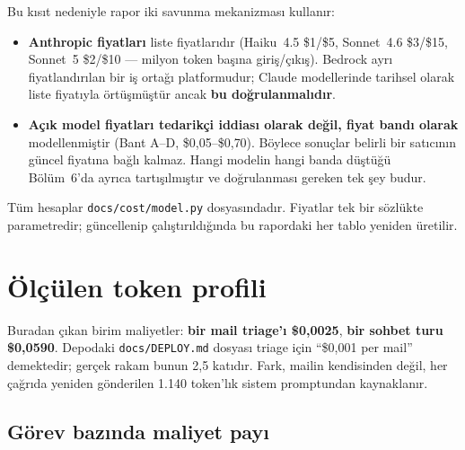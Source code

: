 \documentclass[11pt,a4paper]{article}
\newcommand{\code}[1]{\texttt{\small #1}}
\begin{document}
Bu kısıt nedeniyle rapor iki savunma mekanizması kullanır:

\begin{itemize}[leftmargin=1.4em,itemsep=3pt]
  \item \textbf{Anthropic fiyatları} liste fiyatlarıdır (Haiku~4.5 \$1/\$5,
        Sonnet~4.6 \$3/\$15, Sonnet~5 \$2/\$10 --- milyon token başına giriş/çıkış).
        Bedrock ayrı fiyatlandırılan bir iş ortağı platformudur; Claude modellerinde
        tarihsel olarak liste fiyatıyla örtüşmüştür ancak \textbf{bu doğrulanmalıdır}.
  \item \textbf{Açık model fiyatları tedarikçi iddiası olarak değil, fiyat bandı olarak}
        modellenmiştir (Bant A--D, \$0{,}05--\$0{,}70). Böylece sonuçlar belirli bir
        satıcının güncel fiyatına bağlı kalmaz. Hangi modelin hangi banda düştüğü
        Bölüm~6'da ayrıca tartışılmıştır ve doğrulanması gereken tek şey budur.
\end{itemize}

Tüm hesaplar \code{docs/cost/model.py} dosyasındadır. Fiyatlar tek bir sözlükte
parametredir; güncellenip çalıştırıldığında bu rapordaki her tablo yeniden üretilir.

\section{Ölçülen token profili}

\begin{table}[h]
\centering\small

\caption{Çağrı başına token profili. Ack ve sohbet her kullanıcı mesajında birlikte çalışır.}
\end{table}

Buradan çıkan birim maliyetler: \textbf{bir mail triage'ı \$0{,}0025},
\textbf{bir sohbet turu \$0{,}0590}. Depodaki \code{docs/DEPLOY.md} dosyası triage için
``\$0{,}001 per mail'' demektedir; gerçek rakam bunun 2{,}5 katıdır. Fark, mailin
kendisinden değil, her çağrıda yeniden gönderilen 1.140 token'lık sistem promptundan
kaynaklanır.

\subsection{Görev bazında maliyet payı}

\begin{table}[h]
\centering\small

\caption{Orta profil (50 mail, 8 sohbet/gün), bugünkü yapılandırma.}
\end{table}
\end{document}
